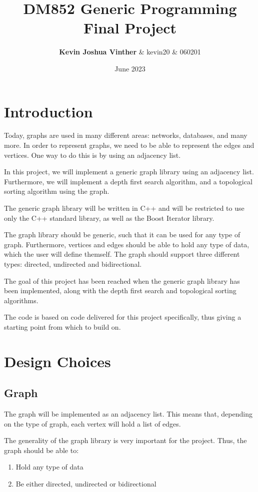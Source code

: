 \documentclass{article}
\title{DM852 Generic Programming Final Project}
\author{\textbf{Kevin Joshua Vinther} & kevin20 & 060201}
\date{June 2023}
\begin{document}
\maketitle

\section{Introduction}

Today, graphs are used in many different areas: networks, databases, and many more. In order to represent graphs, we need to be able to represent the edges and vertices. One way to do this is by using an adjacency list. 

In this project, we will implement a generic graph library using an adjacency list. Furthermore, we will implement a depth first search algorithm, and a topological sorting algorithm using the graph. 

The generic graph library will be written in C++ and will be restricted to use only the C++ standard library, as well as the Boost Iterator library.

The graph library should be generic, such that it can be used for any type of graph.
Furthermore, vertices and edges should be able to hold any type of data, which the user will define themself.
The graph should support three different types: directed, undirected and bidirectional.

The goal of this project has been reached when the generic graph library has been implemented, along with the depth first search and topological sorting algorithms.

The code is based on code delivered for this project specifically, thus giving a starting point from which to build on. 

\section{Design Choices}

\subsection{Graph}
The graph will be implemented as an adjacency list. This means that, depending on the type of graph, each vertex will hold a list of edges.

The generality of the graph library is very important for the project. 
Thus, the graph should be able to: 
\begin{enumerate}
    \item Hold any type of data
    \item Be either directed, undirected or bidirectional
\end{enumerate}
\end{document}
